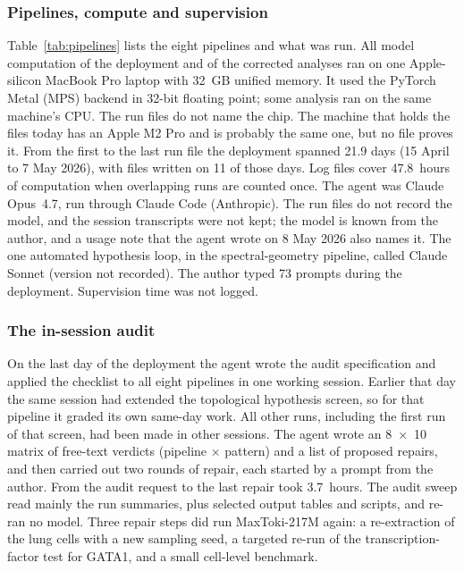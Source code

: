 \subsubsection*{Pipelines, compute and supervision}
Table~\ref{tab:pipelines} lists the eight pipelines and what was run.
All model computation of the deployment and of the corrected analyses ran
on one Apple-silicon MacBook Pro laptop with
32~GB unified memory. It used the PyTorch Metal (MPS) backend in 32-bit
floating point; some analysis ran on the same machine's CPU. The run
files do not name the chip. The machine that holds the files today has
an Apple M2 Pro and is probably the same one, but no file proves it.
From the first to the last run file the deployment spanned 21.9 days (15 April to 7 May 2026), with
files written on 11 of those days. Log files cover 47.8~hours of
computation when overlapping runs are counted once. The agent was Claude
Opus~4.7, run through Claude Code (Anthropic). The run files do not
record the model, and the session transcripts were not kept; the model is
known from the author, and a usage note that the agent wrote on 8 May
2026 also names it. The one automated hypothesis loop, in the
spectral-geometry pipeline, called Claude Sonnet (version not recorded).
The author typed 73
prompts during the deployment. Supervision time was not logged.


\subsubsection*{The in-session audit}
On the last day of the deployment the agent wrote the audit specification
and applied the checklist to all eight pipelines in one working session.
Earlier that day the same session had extended the topological hypothesis
screen, so for that pipeline it graded its own same-day work. All other
runs, including the first run of that screen, had been made in other
sessions. The agent wrote an 8~$\times$~10
matrix of free-text verdicts (pipeline $\times$ pattern) and a list of
proposed repairs, and then carried out two rounds of repair, each started
by a prompt from the author. From the audit request to the last repair
took 3.7~hours. The audit sweep read mainly the run summaries, plus
selected output tables and scripts, and re-ran no model. Three repair
steps did run MaxToki-217M again: a re-extraction of the lung cells with a
new sampling seed, a targeted re-run of the transcription-factor test for
GATA1, and a small cell-level benchmark.

